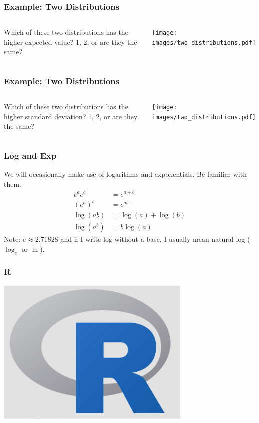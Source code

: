 \documentclass{beamer}
\begin{document}
\begin{frame}
\frametitle{Example: Two Distributions}

    \begin{columns} %
        Which of these two distributions has the higher expected value?
        1, 2, or are they the same?

        \texttt{[image: images/two\_distributions.pdf]}

     \end{columns}

\end{frame}

\begin{frame}
\frametitle{Example: Two Distributions}

    \begin{columns} %
        Which of these two distributions has the higher
        standard deviation?
        1, 2, or are they the same?

        \texttt{[image: images/two\_distributions.pdf]}

     \end{columns}

\end{frame}

\begin{frame}
\frametitle{Log and Exp}
We will occasionally make use of logarithms and exponentials.
Be familiar with them.\pause
\begin{align}
e^a e^b &= e^{a+b} \\
(e^a)^b &= e^{ab} \\
\log(ab) &= \log(a) + \log(b) \\
\log(a^b) &= b \log(a)
\end{align}\pause
Note: $e \approx 2.71828$ and if I write log without a base, I usually mean
natural log ($\log_e$ or $\ln$).
\end{frame}

\begin{frame}
\frametitle{R}

\begin{center}
\includegraphics[width=0.7\textwidth]{images/Rlogo.png}
\end{center}


\end{frame}
\end{document}
